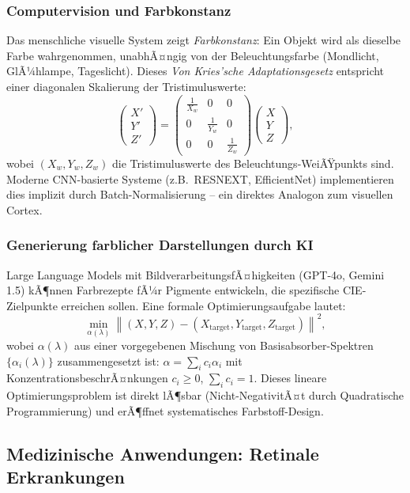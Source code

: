 ﻿\documentclass[a4paper,12pt]{article}
\theoremstyle{definition}
\begin{document}
\subsubsection{Computervision und Farbkonstanz}

Das menschliche visuelle System zeigt \emph{Farbkonstanz}: Ein Objekt wird als
dieselbe Farbe wahrgenommen, unabhÃ¤ngig von der Beleuchtungsfarbe (Mondlicht,
GlÃ¼hlampe, Tageslicht). Dieses \emph{Von Kries'sche Adaptationsgesetz} entspricht
einer diagonalen Skalierung der Tristimuluswerte:
\[
  \begin{pmatrix}X'\\Y'\\Z'\end{pmatrix} = \begin{pmatrix}\frac{1}{X_w} & 0 & 0 \\ 0 & \frac{1}{Y_w} & 0 \\ 0 & 0 & \frac{1}{Z_w}\end{pmatrix} \begin{pmatrix}X\\Y\\Z\end{pmatrix},
\]
wobei $(X_w, Y_w, Z_w)$ die Tristimuluswerte des Beleuchtungs-WeiÃŸpunkts sind.
Moderne CNN-basierte Systeme (z.B.\ RESNEXT, EfficientNet) implementieren dies
implizit durch Batch-Normalisierung -- ein direktes Analogon zum visuellen Cortex.

\subsubsection{Generierung farblicher Darstellungen durch KI}

Large Language Models mit BildverarbeitungsfÃ¤higkeiten (GPT-4o, Gemini 1.5)
kÃ¶nnen Farbrezepte fÃ¼r Pigmente entwickeln, die spezifische CIE-Zielpunkte
erreichen sollen. Eine formale Optimierungsaufgabe lautet:
\[
  \min_{\alpha(\lambda)} \left\| (X, Y, Z) - (X_{\mathrm{target}}, Y_{\mathrm{target}}, Z_{\mathrm{target}}) \right\|^2,
\]
wobei $\alpha(\lambda)$ aus einer vorgegebenen Mischung von Basisabsorber-Spektren
$\{\alpha_i(\lambda)\}$ zusammengesetzt ist: $\alpha = \sum_i c_i \alpha_i$
mit KonzentrationsbeschrÃ¤nkungen $c_i \ge 0$, $\sum_i c_i = 1$.
Dieses lineare Optimierungsproblem ist direkt lÃ¶sbar (Nicht-NegativitÃ¤t durch
Quadratische Programmierung) und erÃ¶ffnet systematisches Farbstoff-Design.

\subsection{Medizinische Anwendungen: Retinale Erkrankungen}
\end{document}
